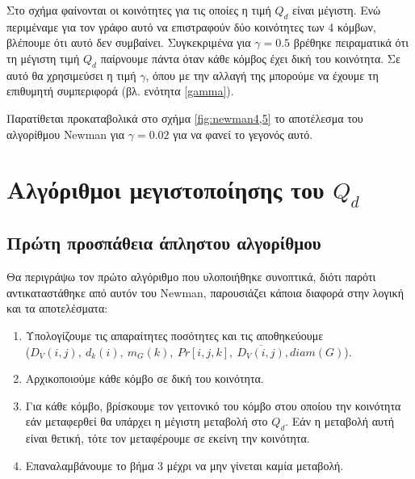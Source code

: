 \documentclass[12pt, letterpaper]{article}
\newcommand{\en}{\selectlanguage{english}}
\newcommand{\gr}{\selectlanguage{greek}}
\begin{document}
Στο σχήμα φαίνονται οι κοινότητες για τις οποίες η τιμή $Q_d$ είναι μέγιστη. Ενώ περιμέναμε για τον γράφο αυτό να επιστραφούν 
δύο κοινότητες των 4 κόμβων, βλέπουμε ότι αυτό δεν συμβαίνει. Συγκεκριμένα για $\gamma = 0.5$ βρέθηκε πειραματικά ότι 
τη μέγιστη τιμή $Q_d$ παίρνουμε πάντα όταν κάθε κόμβος έχει δική του κοινότητα. Σε αυτό θα χρησιμεύσει η τιμή $\gamma$, όπου με την 
αλλαγή της μπορούμε να έχουμε τη επιθυμητή συμπεριφορά (βλ. ενότητα \ref{gamma}).

Παρατίθεται προκαταβολικά στο σχήμα \ref{fig:newman4,5} το αποτέλεσμα του αλγορίθμου \textlatin{Newman} για $\gamma = 0.02$ για να φανεί 
το γεγονός αυτό.















\section{Αλγόριθμοι μεγιστοποίησης του $Q_d$}



\subsection{Πρώτη προσπάθεια άπληστου αλγορίθμου}

Θα περιγράψω τον πρώτο αλγόριθμο που υλοποιήθηκε συνοπτικά, διότι παρότι αντικαταστάθηκε 
από αυτόν του \en Newman, \gr παρουσιάζει κάποια διαφορά στην λογική και τα αποτελέσματα:

\begin{enumerate}
  \item Υπολογίζουμε τις απαραίτητες ποσότητες και τις αποθηκεύουμε \\ ($D_V(i,j), \ d_k(i), \ m_G(k), \ Pr[i,j,k],  \ \overline{D_V(i,j)},diam(G)$).
  \item Αρχικοποιούμε κάθε κόμβο σε δική του κοινότητα.
  \item Για κάθε κόμβο, βρίσκουμε τον γειτονικό του κόμβο στου οποίου την κοινότητα 
  εάν μεταφερθεί θα υπάρχει η μέγιστη μεταβολή στο $Q_d$. Εάν η μεταβολή αυτή είναι θετική,
  τότε τον μεταφέρουμε σε εκείνη την κοινότητα.
  \item Επαναλαμβάνουμε το βήμα 3 μέχρι να μην γίνεται καμία μεταβολή.
\end{enumerate}
\end{document}

